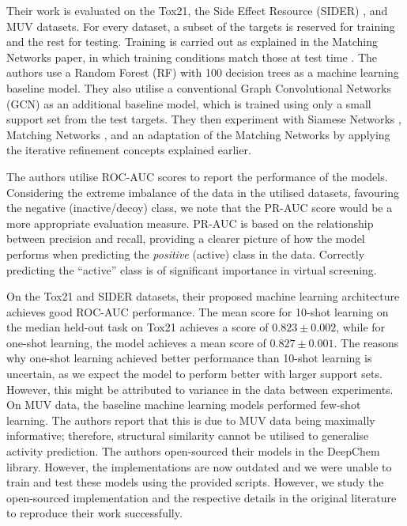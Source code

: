 Their work is evaluated on the Tox21, the Side Effect Resource (SIDER) \citep{kuhn2016sider}, and MUV datasets\citep{rohrer2009maximum}. For every dataset, a subset of the targets is reserved for training and the rest for testing. Training is carried out as explained in the Matching Networks paper, in which training conditions match those at test time \citep{vinyals2016matching}. The authors use a Random Forest (RF) with 100 decision trees as a machine learning baseline model. They also utilise a conventional Graph Convolutional Networks (GCN) \citep{kipf2016semi} as an additional baseline model, which is trained using only a small support set from the test targets. They then experiment with Siamese Networks \citep{koch2015siamese}, Matching Networks \citep{vinyals2016matching}, and an adaptation of the Matching Networks by applying the iterative refinement concepts explained earlier.

The authors utilise ROC-AUC scores to report the performance of the models. Considering the extreme imbalance of the data in the utilised datasets, favouring the negative (inactive/decoy) class, we note that the PR-AUC score would be a more appropriate evaluation measure. PR-AUC is based on the relationship between precision and recall, providing a clearer picture of how the model performs when predicting the \textit{positive} (active) class in the data. Correctly predicting the ``active'' class is of significant importance in virtual screening.

On the Tox21 and SIDER datasets, their proposed machine learning architecture achieves good ROC-AUC performance. The mean score for 10-shot learning on the median held-out task on Tox21 achieves a score of $0.823 \pm 0.002$, while for one-shot learning, the model achieves a mean score of $0.827 \pm 0.001$. The reasons why one-shot learning achieved better performance than 10-shot learning is uncertain, as we expect the model to perform better with larger support sets. However, this might be attributed to variance in the data between experiments. On MUV data, the baseline machine learning models performed few-shot learning. The authors report that this is due to MUV data being maximally informative; therefore, structural similarity cannot be utilised to generalise activity prediction. The authors open-sourced their models in the DeepChem library\citep{ramsundar2019deep}. However, the implementations are now outdated and we were unable to train and test these models using the provided scripts. However, we study the open-sourced implementation and the respective details in the original literature to reproduce their work successfully.
